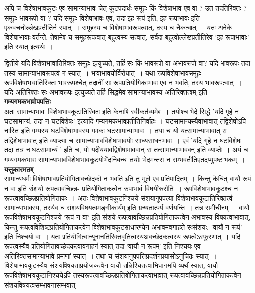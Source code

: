 {अपि च विशेषाभावकूटः एव सामान्याभावः चेत् कूटपदार्थः समूहः किं विशेषाभाव एव वा ? उत तदतिरिक्तः ? समूहः भावरूपो वा ? यदि समूहः विशेषाभावः एव, तदा इह रूपं इति, इह रूपाभावः इति एकवचनोल्लेखप्रतीतिर्न स्यात्~। समूहस्य च विशेषाभावरूपत्वात्, तस्य च नैकत्वात्~। यतः अनेके विशेषाभावाः वर्तन्ते, तेषामेव च समूहरूपत्वात् बहुत्वस्य सत्वात्, सर्वदा बहुत्वोल्लेखप्रतीतिरेव ’इह रूपाभावाः’ इति स्यात् इत्यर्थः~। 

द्वितीये यदि विशेषाभावातिरिक्तः समूहः इत्युच्यते, तर्हि सः किं भावरूपो वा अभावरूपो वा? यदि भावरूपः तदा तस्य सामान्याभावरूपत्वं न स्यात्~। भावाभावयोर्विरोधात्~। यथा रूपविशेषाभावसमूहः रूपविशेषाभावातिरिक्तः भावरूपश्चेत् तदानीं सः रूपप्रतियोगिकाभावः एव न भवति, तस्य भावरूपत्वात्~। यदि अतिरिक्तः सः अभावरूपः इत्युच्यते तर्हि सिद्धमेव सामान्याभावस्य अतिरिक्तत्वम् इति~।
~\\[0.2cm]
\textbf{गम्यगमकभावोपपत्तिः}\\
 अतः सामान्याभावः विशेषाभावकूटातिरिक्तः इति केनापि \-स्वीकर्तव्यमेव~। तयोश्च भेदे सिद्धे ’यदि गृहे न घटसामान्यं, तदा न घटविशेषः’ इत्यादि गम्यगमकभावप्रतीतिनिर्वाहः~। घटसामान्यस्यैवाभावात् तद्विशेषोऽपि नास्ति इति गम्यस्य घटविशेषाभावस्य गमकः घटसामान्याभावः~। तथा च यो यत्सामान्याभावात् स तद्विशेषाभावात् इति व्याप्त्या च सामान्याभावविशेषाभावयोः साध्यसाधनभावः~। एवं ’यदि गृहे न घटविशेषः तदा तत्र न घटसामान्यं ’ इति च, यो यदीययावद्विशेषाभाववान् स तत्सामान्याभाववन् इति व्याप्तेः~। अयं च गम्यगमकभावः सामान्याभावविशेषाभावकूटयोर्भेदनिबन्धः तयोः भेदमन्तरा न सम्भवतीति\break एतदप्युपष्टम्भकम्~।
 ~\\[0.2cm]
 \textbf{यत्तुकारमतम्}\\
 सामान्यधर्मः विशेषाभावप्रतियोगितावच्छेदको न भवति इति तु मूले एव प्रतिपादितम्~। किन्तु केचित् वायौ रूपं न वा इति संशयो रूपत्वावच्छिन्न- प्रतियोगिताकत्वेन रूपाभावं विषयीकरोति~। रूपविशेषाभावकूटश्च न रूपत्वावच्छिन्नप्रतियोगिताकः~। अतः विशेषाभावकूटनिश्चये संशयानुपपत्या विशेषाभावकूटातिरिक्तत्वं सामान्याभावस्य, तस्यैव च संशयविषयत्वमङ्गीकार्यम् इति ग्रन्थतात्पर्यं वर्णयन्ति~। तन्न समीचीनम्~। वायौ रूपविशेषाभावकूट\-निश्चये ’रूपं न वा’ इति संशये रूपत्वावच्छिन्नप्रतियोगिताकत्वेन अभावस्य विषयत्वाभावात्, किन्तु रूपत्वविशिष्टप्रतियोगिताकत्वेन विशेषाभावकूटसाधारण्येन अभावमवगाहते सः\break संशयः, ’वायौ न रूपं’ इति निश्चयो वा~। यतः प्रतियोगित्वान्यूनानतिरिक्तवृत्तित्वस्य\break  अवच्छेदकत्वस्य रूपत्वेऽस्फुरणात्~। यदि रूपत्वस्यैव प्रतियोगितावच्छेदकत्वावगाहनं स्यात् तदा ’वायौ न रूपम्’ इति निश्चयः एव अतिरिक्तसामान्याभावे प्रमाणां स्यात्~। तथा च संशयानुपपत्तिप्रदर्शनप्रयासोऽनुचितः स्यात्~। विशेषाभावकूटस्यैव संशयविषयताप्रयोजकत्वेन वायौ तन्निश्चितत्वाभिधानमपि व्यर्थं स्यात्, वायौ रूपविशेषाभावकूटानिश्चयेऽपि तस्य\break रूपत्वावच्छिन्नप्रतियोगिताकत्वाभावात् रूपत्वावच्छिन्नप्रतियोगिताकत्वेन संशयविषयत्वसम्भावनासम्भवात्~। 

}
